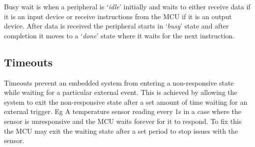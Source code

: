 \noindent Busy wait is when a peripheral is `\textit{idle}' initially and waits to either receive data if it is
an input device or receive instructions from the MCU if it is an output device. After data is
received the peripheral starts in `\textit{busy}' state and after completion it moves to a
`\textit{done}' state where it waits for the next instruction. 

\subsection{Timeouts}
Timeouts prevent an embedded system from entering a non-responsive state while waiting for a
particular external event. This is achieved by allowing the system to exit the non-responsive state
after a set amount of time waiting for an external trigger. Eg A temperature sensor reading every 1s
in a case where the sensor is unresponsive and the MCU waits forever for it to respond. To fix this
the MCU may exit the waiting state after a set period to stop issues with the sensor.
